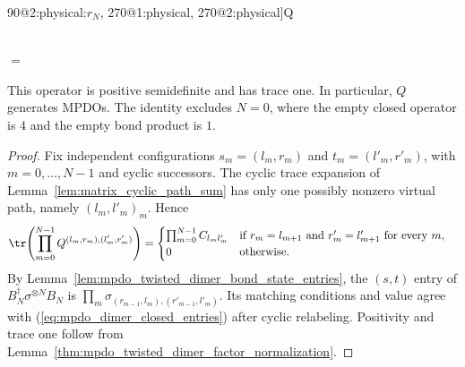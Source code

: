 \begin{lemma}
\begin{center}
\begin{tenkz}[rows={op}, cols=7, boundary=periodic, size=l]
{                        90@2:physical:$r_N$, 270@1:physical,
                        270@2:physical}]{Q}
        \end{tenkz}
        \\[2ex]
        $=$\quad
        \begin{tenkz}[rows={op}, cols=7, bonds=none, size=l]
            \tn[at=(1,1), skin=box, wide=2, ports={90@1:physical:$r_N$,
                        90@2:physical:$l_1$, 270@1:physical,
                        270@2:physical}]{\sigma}
            \tn[at=(1,3), skin=box, wide=2, ports={90@1:physical:$r_1$,
                        90@2:physical:$l_2$, 270@1:physical,
                        270@2:physical}]{\sigma}
            \tn[at=(1,5), skin=dots]{}
            \tn[at=(1,6), skin=box, wide=2, ports={90@1:physical:$r_{N-1}$,
                        90@2:physical:$l_N$, 270@1:physical,
                        270@2:physical}]{\sigma}
        \end{tenkz}
    \end{center}
    This operator is positive semidefinite and has trace one. In
    particular, $Q$ generates MPDOs. The identity excludes $N=0$, where the
    empty closed operator is $4$ and the empty bond product is $1$.
\end{lemma}
\begin{proof}\leanok
    Fix independent configurations $s_m=(l_m,r_m)$ and
    $t_m=(l'_m,r'_m)$, with $m=0,\ldots,N-1$ and cyclic successors.
    The cyclic trace expansion of Lemma~\ref{lem:matrix_cyclic_path_sum}
    has only one possibly nonzero virtual path, namely $(l_m,l'_m)_m$.
    Hence
    \begin{align}
        \tr\!\left(\prod_{m=0}^{N-1}Q^{(l_m,r_m),(l'_m,r'_m)}\right)
         & =\begin{cases}
                \prod_{m=0}^{N-1}C_{l_m l'_m}
                  & \text{if } r_m=l_{m+1} \text{ and } r'_m=l'_{m+1}
                \text{ for every }m,                                  \\
                0 & \text{otherwise}.
            \end{cases}
        \label{eq:mpdo_dimer_closed_entries}
    \end{align}
    By Lemma~\ref{lem:mpdo_twisted_dimer_bond_state_entries}, the
    $(s,t)$ entry of $B_N^\dagger\sigma^{\otimes N}B_N$ is
    $\prod_m\sigma_{(r_{m-1},l_m),(r'_{m-1},l'_m)}$.
    Its matching conditions and value agree with
    (\ref{eq:mpdo_dimer_closed_entries}) after cyclic relabeling.
    Positivity and trace one follow from
    Lemma~\ref{thm:mpdo_twisted_dimer_factor_normalization}.
\end{proof}

